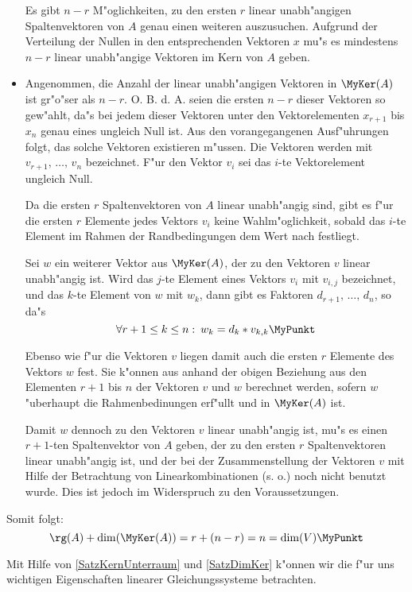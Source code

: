 \begin{beweis}
\begin{itemize}
          Es gibt $n-r$ M"oglichkeiten,
          zu den ersten $r$ linear unabh"angigen Spaltenvektoren von $A$
          genau einen weiteren
          auszusuchen. Aufgrund der Verteilung der Nullen in den 
          entsprechenden Vektoren $x$ mu"s es mindestens $n-r$ linear 
          unabh"angige Vektoren im Kern von $A$ geben.
    \item 
          Angenommen, die Anzahl der linear unabh"angigen Vektoren 
          in $\MyKer(A)$ ist gr"o"ser als $n-r$. O. B. d. A. seien die 
          ersten $n-r$ dieser Vektoren
          so gew"ahlt, da"s bei jedem dieser Vektoren unter den
          Vektorelementen $x_{r+1}$ bis $x_n$ genau eines ungleich Null ist.
          Aus den vorangegangenen Ausf"uhrungen folgt, das solche
          Vektoren existieren m"ussen. Die Vektoren werden mit 
          $v_{r+1}, \, \ldots, \, v_n$ bezeichnet. F"ur den Vektor $v_i$
          sei das $i$-te Vektorelement ungleich Null.
          
          Da die ersten $r$ Spaltenvektoren von $A$ linear unabh"angig sind,
          gibt es f"ur die ersten $r$ Elemente jedes Vektors $v_i$
          keine Wahlm"oglichkeit, sobald das $i$-te Element im
          Rahmen der Randbedingungen dem Wert nach festliegt.

          Sei $w$ ein weiterer Vektor aus $\MyKer(A)$, der zu den Vektoren
          $v$ linear unabh"angig ist. Wird das $j$-te Element eines Vektors
          $v_i$ mit $v_{i,j}$ bezeichnet, und das $k$-te Element von $w$
          mit $w_k$, dann gibt es Faktoren $d_{r+1}, \, \ldots , \, d_n$,
          so da"s
          \[ \forall r+1 \leq k \leq n : \: w_k = d_k * v_{k,k} \MyPunkt \]
          
          Ebenso wie f"ur die Vektoren $v$ liegen damit auch die
          ersten $r$ Elemente des Vektors $w$ fest. Sie k"onnen aus anhand
          der obigen Beziehung aus den Elementen $r+1$ bis $n$ der
          Vektoren $v$ und $w$ berechnet werden, sofern $w$ "uberhaupt die
          Rahmenbedinungen erf"ullt und in $\MyKer(A)$ ist.

          Damit $w$ dennoch zu den Vektoren $v$ linear unabh"angig ist,
          mu"s es einen $r+1$-ten Spaltenvektor von $A$ geben, der zu den
          ersten $r$ Spaltenvektoren linear unabh"angig ist, und der
          bei der Zusammenstellung der Vektoren $v$ mit Hilfe der
          Betrachtung von Linearkombinationen (s. o.) noch nicht benutzt
          wurde. Dies ist jedoch im Widerspruch zu den Voraussetzungen.
    \end{itemize}
    Somit folgt:
    \[ \rg(A) + \dim(\MyKer(A)) = r + (n-r) = n = \dim(V) \MyPunkt \]
\end{beweis}
Mit Hilfe von \ref{SatzKernUnterraum} und \ref{SatzDimKer} k"onnen wir
die f"ur uns wichtigen Eigenschaften linearer Gleichungssysteme
betrachten.


